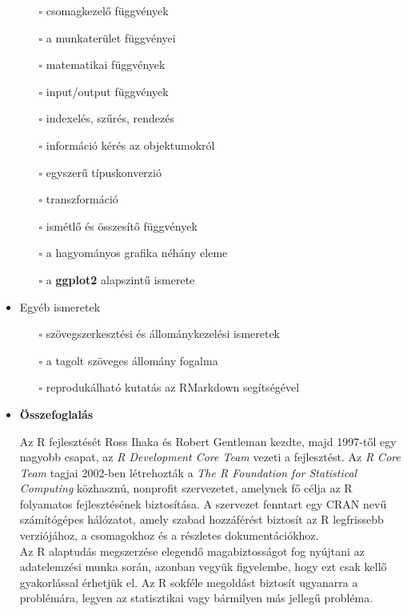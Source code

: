 \documentclass[
]{book}
\providecommand{\tightlist}{%
  \setlength{\itemsep}{0pt}\setlength{\parskip}{0pt}}
\newenvironment{rmdblock}[1]
  {\begin{shaded*}
  \begin{itemize}
  \renewcommand{\labelitemi}{
    \raisebox{-.7\height}[0pt][0pt]{
      {\setkeys{Gin}{width=3em,keepaspectratio}\texttt{[image: images/\#1]}}
    }
  }
  \item
  }
  {
  \end{itemize}
  \end{shaded*}
  }
\newenvironment{rmdsummary}
  {\begin{rmdblock}{summary}}
  {\end{rmdblock}}
\begin{document}
\begin{itemize}
  \begin{itemize}
  \tightlist
  \item[$\square$]
    csomagkezelő függvények
  \item[$\square$]
    a munkaterület függvényei
  \item[$\square$]
    matematikai függvények
  \item[$\square$]
    input/output függvények
  \item[$\square$]
    indexelés, szűrés, rendezés
  \item[$\square$]
    információ kérés az objektumokról
  \item[$\square$]
    egyszerű típuskonverzió
  \item[$\square$]
    transzformáció
  \item[$\square$]
    ismétlő és összesítő függvények
  \item[$\square$]
    a hagyományos grafika néhány eleme
  \item[$\square$]
    a \textbf{ggplot2} alapszintű ismerete
  \end{itemize}
\item
  Egyéb ismeretek

  \begin{itemize}
  \tightlist
  \item[$\square$]
    szövegszerkesztési és állománykezelési ismeretek
  \item[$\square$]
    a tagolt szöveges állomány fogalma
  \item[$\square$]
    reprodukálható kutatás az RMarkdown segítségével
  \end{itemize}
\end{itemize}

\begin{rmdsummary}
\textbf{Összefoglalás}

Az R fejlesztését Ross Ihaka és Robert Gentleman kezdte, majd 1997-től
egy nagyobb csapat, az \emph{R Development Core Team} vezeti a
fejlesztést. Az \emph{R Core Team} tagjai 2002-ben létrehozták a
\emph{The R Foundation for Statistical Computing} közhasznú, nonprofit
szervezetet, amelynek fő célja az R folyamatos fejlesztésének
biztosítása. A szervezet fenntart egy CRAN nevű számítógépes hálózatot,
amely szabad hozzáférést biztosít az R legfrissebb verziójához, a
csomagokhoz és a részletes dokumentációkhoz.\\
Az R alaptudás megszerzése elegendő magabiztosságot fog nyújtani az
adatelemzési munka során, azonban vegyük figyelembe, hogy ezt csak kellő
gyakorlással érhetjük el. Az R sokféle megoldást biztosít ugyanarra a
problémára, legyen az statisztikai vagy bármilyen más jellegű probléma.
\end{rmdsummary}
\end{document}
